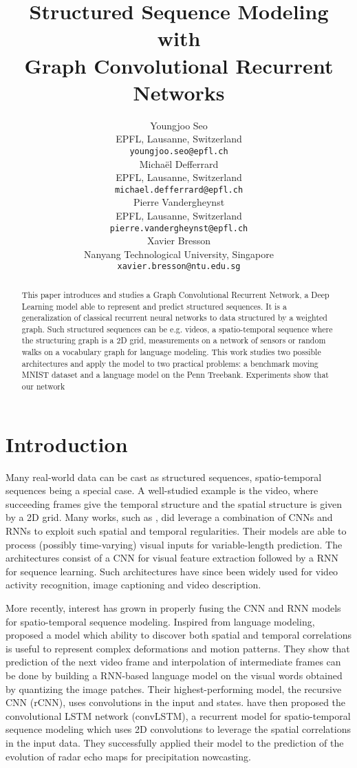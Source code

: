 \documentclass{article} %
\title{Structured Sequence Modeling with \\
Graph Convolutional Recurrent Networks}
\author{Youngjoo Seo \\
EPFL, Lausanne, Switzerland \\
\texttt{youngjoo.seo@epfl.ch} \\
\And
Michaël Defferrard \\
EPFL, Lausanne, Switzerland \\
\texttt{michael.defferrard@epfl.ch} \\
\And
Pierre Vandergheynst \\
EPFL, Lausanne, Switzerland \\
\texttt{pierre.vandergheynst@epfl.ch} \\
\And
Xavier Bresson \\
Nanyang Technological University, Singapore \\
\texttt{xavier.bresson@ntu.edu.sg} \\
}
\newcommand{\todo}[1]{{\color{red} #1 }}
\begin{document}
\maketitle

\begin{abstract}
	This paper introduces and studies a Graph Convolutional Recurrent
	Network, a Deep Learning model able to represent and predict structured
	sequences. It is a generalization of classical recurrent neural networks to
	data structured by a weighted graph.
	Such structured sequences can be e.g. videos, a spatio-temporal sequence
	where the structuring graph is a 2D grid, measurements on a network of
	sensors or random walks on a vocabulary graph for language modeling.
	This work studies two possible architectures and apply the model to two
	practical problems: a benchmark moving MNIST dataset and a language model
	on the Penn Treebank. Experiments \todo{show that our network}
\end{abstract}

\section{Introduction}


Many real-world data can be cast as structured sequences, spatio-temporal
sequences being a special case. A well-studied example is the video, where
succeeding frames give the temporal structure and the spatial structure is
given by a 2D grid. Many works, such as \citet{cnnlstm1, cnnlstm2, cnnlstm3},
did leverage a combination of CNNs and RNNs to exploit such spatial and
temporal regularities. Their models are able to process (possibly time-varying)
visual inputs for variable-length prediction. The architectures consist of a
CNN for visual feature extraction followed by a RNN for sequence learning. Such
architectures have since been widely used for video activity recognition, image
captioning and video description.

More recently, interest has grown in properly fusing the CNN and RNN models for
spatio-temporal sequence modeling. Inspired from language modeling,
\citet{video_language_model} proposed a model which ability to discover both
spatial and temporal correlations is useful to represent complex deformations
and motion patterns. They show that prediction of the next video frame and
interpolation of intermediate frames can be done by building a RNN-based
language model on the visual words obtained by quantizing the image patches.
Their highest-performing model, the recursive CNN (rCNN), uses convolutions in
the input and states. \citet{convlstm} have then proposed the convolutional
LSTM network (convLSTM), a recurrent model for spatio-temporal sequence
modeling which uses 2D convolutions to leverage the spatial correlations in the
input data. They successfully applied their model to the prediction of the
evolution of radar echo maps for precipitation nowcasting.
\end{document}
